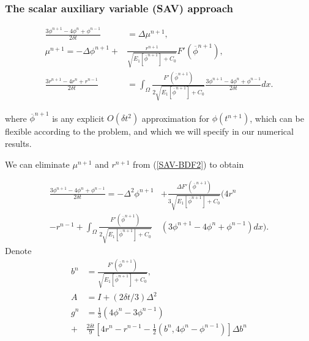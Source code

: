 \documentclass{beamer}
\begin{document}
    \begin{frame}
\frametitle{The scalar auxiliary variable (SAV) approach}

\begin{equation}\label{SAV-BDF2}
  \begin{split}
\frac{3\phi^{n+1}-4\phi^n+\phi^{n-1}}{2\delta t}&=\Delta\mu^{n+1},\\
\mu^{n+1}=-\Delta\phi^{n+1}+&\frac{r^{n+1}}{\sqrt{E_1[\overline{\phi}^{n+1}]+C_0}}F'(\overline{\phi}^{n+1}),\\
\frac{3r^{n+1}-4r^n+r^{n-1}}{2\delta t}&=\int_{\Omega}\frac{F'(\overline{\phi}^{n+1})}{2\sqrt{E_1[\overline{\phi}^{n+1}]+C_0}}\frac{3\phi^{n+1}-4\phi^n+\phi^{n-1}}{2\delta t} dx.
  \end{split}
\end{equation}

where $\overline{\phi}^{n+1}$ is any explicit $O(\delta t^2)$ approximation for $\phi(t^{n+1})$, which can be flexible according to the problem, and which we will specify in our numerical results.

    \end{frame}
    \begin{frame}

We can eliminate $\mu^{n+1}$ and $r^{n+1}$ from (\ref{SAV-BDF2}) to obtain

\begin{equation}\label{3.6}
\begin{split}
   \frac{3\phi^{n+1}-4\phi^n+\phi^{n-1}}{2\delta t}=-\Delta^2\phi^{n+1}&+\frac{\Delta F'(\overline{\phi}^{n+1})}{3\sqrt{E_1[\overline{\phi}^{n+1}]+C_0}}(4r^n \\
   -r^{n-1}+\int_{\Omega}\frac{F'(\overline{\phi}^{n+1})}{2\sqrt{E_1[\overline{\phi}^{n+1}]+C_0}}&(3\phi^{n+1}-4\phi^n+\phi^{n-1})dx).
\end{split}
\end{equation}
Denote
\begin{equation}\label{bn}
  \begin{split}
b^n&=\frac{F'(\overline{\phi}^{n+1})}{\sqrt{E_1[\overline{\phi}^{n+1}]+C_0}}, \\
A&=I+(2\delta t/3)\Delta^2 \\
g^n&=\frac{1}{3}(4\phi^n-3\phi^{n-1})\\
+&\frac{2\delta t}{9}[4r^n-r^{n-1}-\frac{1}{2}(b^n,4\phi^n-\phi^{n-1})]\Delta b^n
  \end{split}
\end{equation}


    \end{frame}
\end{document}
